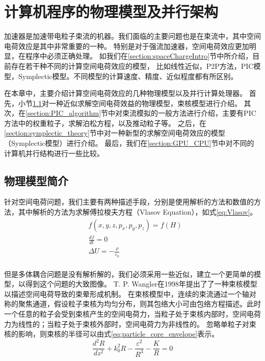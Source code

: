 
\chapter{计算机程序的物理模型及并行架构}
\label{chap:Algorithm}
加速器是加速带电粒子束流的机器。我们面临的主要问题也是在束流中，其中空间电荷效应是其中非常重要的一种。
特别是对于强流加速器，空间电荷效应更加明显，在程序中必须正确处理。
如我们在\ref{section:spaceChargeIntro}节中所介绍，目前存在若干种不同的计算空间电荷效应的模型，
比如线性近似，P2P方法，PIC模型，Symplectic模型。不同模型的计算速度、精度、近似程度都有所区别。

在本章中，主要介绍计算空间电荷效应的几种物理模型以及并行计算处理器。
首先，小节\ref{section:particle_core}对一种近似求解空间电荷效益的物理模型，束核模型进行介绍。
其次，在\ref{section:PIC_algorithm}节中对束流模拟的一般方法进行介绍，主要有PIC方法中的权重粒子，求解泊松方程，以及推动粒子等。
之后，在\ref{section:symplectic_theory}节中对一种新型的求解空间电荷效应的模型（Symplectic模型）进行介绍。
最后，我们在\ref{section:GPU_CPU}节中对不同的计算机并行结构进行一些比较。

\section{物理模型简介}            \label{section:particle_core}
针对空间电荷问题，我们主要有两种描述手段，分别是使用解析的方法和数值的方法，其中解析的方法为求解傅拉梭夫方程（Vlasov Equation），如式\ref{eq:Vlasov}。
\begin{equation}
    \label{eq:Vlasov}
    \begin{aligned}
        & f(x,y,z,{{p}_{x}},{{p}_{y}},{{p}_{z}})=f(H) \\
        & \frac{df}{dt}=0 \\
        & \Delta U=-\frac{\rho }{{{\varepsilon }_{0}}} \\
    \end{aligned}
\end{equation}

但是多体耦合问题是没有解析解的，我们必须采用一些近似，建立一个更简单的模型，以得到这个问题的大致图像。
T. P. Wangler在1998年提出了了一种束核模型\cite{wangler1998particle}以描述空间电荷导致的束晕形成机制。
在束核模型中，连续的束流通过一个轴对称的聚焦通道，假设粒子束核为均匀分布，则其包络大小可由包络方程描述。此时一个任意的粒子会受到束核产生的空间电荷力，当粒子处于束核内部时，空间电荷力为线性的；当粒子处于束核外部时，空间电荷力为非线性的。
忽略单粒子对束核的影响，则束核的半径可以由式\ref{eq:particle_core_envelope}表示。
\begin{equation}
    \label{eq:particle_core_envelope}
    \frac{{{d}^{2}}R}{d{{z}^{2}}}+k_{0}^{2}R-\frac{{{\varepsilon }^{2}}}{{{R}^{3}}}-\frac{K}{R}=0
\end{equation}

